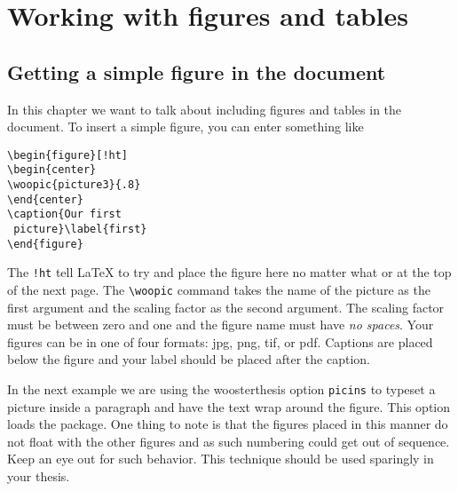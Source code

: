 \chapter{Working with figures and tables}\label{graphics}

\section{Getting a simple figure in the document}
In this chapter we want to talk about including figures and tables in the document. To insert a simple figure, you can enter something like
\begin{singlespace}\small
\begin{verbatim}
\begin{figure}[!ht]
\begin{center}
\woopic{picture3}{.8}
\end{center}
\caption{Our first
 picture}\label{first}
\end{figure}
\end{verbatim}
\end{singlespace}
\vspace{-1.8 in}
\begin{figure}[!ht]
\end{figure}

The \verb|!ht| tell \LaTeX{} to try and place the figure here no matter what or at the top of the next page. The \verb|\woopic| command takes the name of the picture as the first argument and the scaling factor as the second argument. The scaling factor must be between zero and one and the figure name must have \emph{no spaces}. Your figures can be in one of four formats: jpg, png, tif, or pdf. Captions are placed below the figure and your label should be placed after the caption.

In the next example we are using the woosterthesis option \verb|picins| to typeset a picture inside a paragraph and have the text wrap around the figure. This option loads the  package. One thing to note is that the figures placed in this manner do not float with the other figures and as such numbering could get out of sequence. Keep an eye out for such behavior.  This technique should be used sparingly in your thesis.

